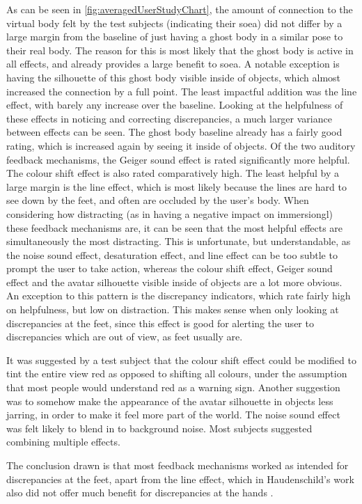 As can be seen in \autoref{fig:averagedUserStudyChart}, the amount of connection to the virtual body felt by the test subjects (indicating their \gls{soea}) did not differ by a large margin from the baseline of just having a ghost body in a similar pose to their real body. The reason for this is most likely that the ghost body is active in all effects, and already provides a large benefit to \gls{soea}. A notable exception is having the silhouette of this ghost body visible inside of objects, which almost increased the connection by a full point. The least impactful addition was the line effect, with barely any increase over the baseline.
\newline
Looking at the helpfulness of these effects in noticing and correcting discrepancies, a much larger variance between effects can be seen. The ghost body baseline already has a fairly good rating, which is increased again by seeing it inside of objects. Of the two auditory feedback mechanisms, the Geiger sound effect is rated significantly more helpful. The colour shift effect is also rated comparatively high. The least helpful by a large margin is the line effect, which is most likely because the lines are hard to see down by the feet, and often are occluded by the user's body.
\newline
When considering how distracting (as in having a negative impact on \gls{immersiongl}) these feedback mechanisms are, it can be seen that the most helpful effects are simultaneously the most distracting. This is unfortunate, but understandable, as the noise sound effect, desaturation effect, and line effect can be too subtle to prompt the user to take action, whereas the colour shift effect, Geiger sound effect and the avatar silhouette visible inside of objects are a lot more obvious. An exception to this pattern is the discrepancy indicators, which rate fairly high on helpfulness, but low on distraction. This makes sense when only looking at discrepancies at the feet, since this effect is good for alerting the user to discrepancies which are out of view, as feet usually are.
\newline

It was suggested by a test subject that the colour shift effect could be modified to tint the entire view red as opposed to shifting all colours, under the assumption that most people would understand red as a warning sign. Another suggestion was to somehow make the appearance of the avatar silhouette in objects less jarring, in order to make it feel more part of the world. The noise sound effect was felt likely to blend in to background noise. Most subjects suggested combining multiple effects.

The conclusion drawn is that most feedback mechanisms worked as intended for discrepancies at the feet, apart from the line effect, which in Haudenschild's work also did not offer much benefit for discrepancies at the hands \autocite[p. ~32]{JohnnyVEThesis}.  
